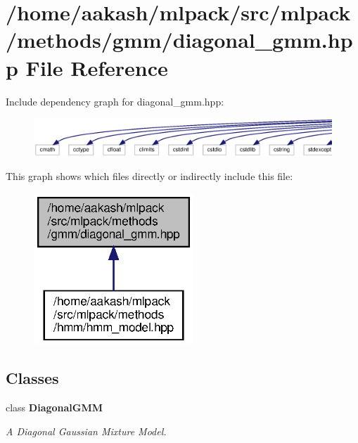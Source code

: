 \section{/home/aakash/mlpack/src/mlpack/methods/gmm/diagonal\+\_\+gmm.hpp File Reference}
\label{diagonal__gmm_8hpp}
Include dependency graph for diagonal\+\_\+gmm.\+hpp\+:
\nopagebreak
\begin{figure}[H]
\begin{center}
\leavevmode
\includegraphics[width=350pt]{diagonal__gmm_8hpp__incl}
\end{center}
\end{figure}
This graph shows which files directly or indirectly include this file\+:
\nopagebreak
\begin{figure}[H]
\begin{center}
\leavevmode
\includegraphics[width=170pt]{diagonal__gmm_8hpp__dep__incl}
\end{center}
\end{figure}
\subsection*{Classes}
\begin{DoxyCompactItemize}
\item 
class \textbf{ Diagonal\+G\+MM}
\begin{DoxyCompactList}\small\item\em A Diagonal Gaussian Mixture Model. \end{DoxyCompactList}\end{DoxyCompactItemize}
